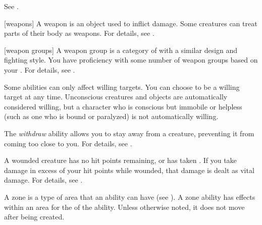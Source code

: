  See .

[weapons] A weapon is an object used to inflict damage.
Some creatures can treat parts of their body as weapons.
For details, see .

[weapon groups] A weapon group is a category of  with a similar design and fighting style.
You have proficiency with some number of weapon groups based on your .
For details, see .

 Some abilities can only affect willing targets. You can choose to be a willing target at any time. Unconscious creatures and objects are automatically considered willing, but a character who is conscious but immobile or helpless (such as one who is bound or paralyzed) is not automatically willing.

 The \textit{withdraw} ability allows you to stay away from a creature, preventing it from coming too close to you.
For details, see .

 A wounded creature has no hit points remaining, or has taken .
If you take damage in excess of your hit points while wounded, that damage is dealt as vital damage.
For details, see .

 A zone is a type of area that an ability can have (see ).
A zone ability has effects within an area for the  of the ability.
Unless otherwise noted, it does not move after being created.
